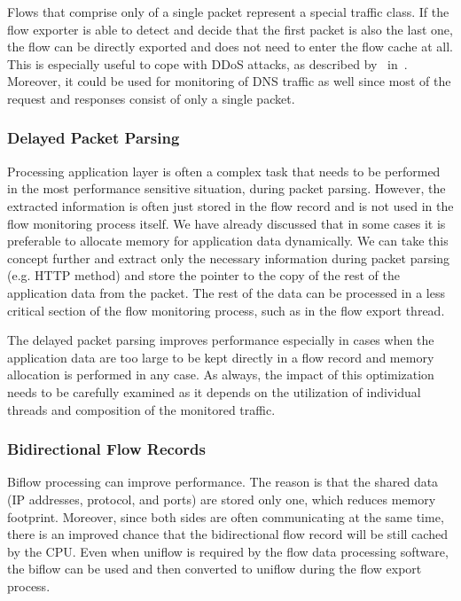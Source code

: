 Flows that comprise only of a single packet represent a special traffic class. If the flow exporter is able to detect and decide that the first packet is also the last one, the flow can be directly exported and does not need to enter the flow cache at all. This is especially useful to cope with DDoS attacks, as described by~\citeauthor{Sadre-2012-Effects} in~\cite{Sadre-2012-Effects}. Moreover, it could be used for monitoring of DNS traffic as well since most of the request and responses consist of only a single packet.

\subsubsection{Delayed Packet Parsing}

Processing application layer is often a complex task that needs to be performed in the most performance sensitive situation, during packet parsing. However, the extracted information is often just stored in the flow record and is not used in the flow monitoring process itself. We have already discussed that in some cases it is preferable to allocate memory for application data dynamically. We can take this concept further and extract only the necessary information during packet parsing (e.g. HTTP method) and store the pointer to the copy of the rest of the application data from the packet. The rest of the data can be processed in a less critical section of the flow monitoring process, such as in the flow export thread. 

The delayed packet parsing improves performance especially in cases when the application data are too large to be kept directly in a flow record and memory allocation is performed in any case. As always, the impact of this optimization needs to be carefully examined as it depends on the utilization of individual threads and composition of the monitored traffic.

\subsubsection{Bidirectional Flow Records}

Biflow processing can improve performance. The reason is that the shared data (IP addresses, protocol, and ports) are stored only one, which reduces memory footprint. Moreover, since both sides are often communicating at the same time, there is an improved chance that the bidirectional flow record will be still cached by the CPU. Even when uniflow is required by the flow data processing software, the biflow can be used and then converted to uniflow during the flow export process.


